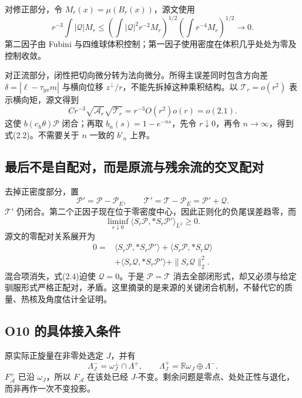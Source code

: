 \documentclass[UTF8,11pt,openany,fontset=none]{ctexbook}
\theoremstyle{definition}
\theoremstyle{remark}
\begin{document}
对修正部分，令 \(M_r(x)=\mu(B_r(x))\)，源文使用 \[
 r^{-3}\int |\mathscr Q|M_r
 \le
 \left(\int|\mathscr Q|^2r^{-2}M_r\right)^{1/2}
 \left(\int r^{-4}M_r\right)^{1/2}\longrightarrow0.
\] 第二因子由 Fubini 与四维球体积控制；第一因子使用密度在体积几乎处处为零及控制收敛。

对正流部分，闭性把切向微分转为法向微分。所得主误差同时包含方向差 \(\delta=|\ell-\tau_{yx}m|\) 与横向位移 \(z^\perp/r\)，不能先拆掉这种乘积结构。以 \(\mathcal T_r=o(r^2)\) 表示横向矩，源文得到 \[
 Cr^{-3}\sqrt{\mathcal A_r}\sqrt{\mathcal T_r}
 =r^{-3}O(r^2)o(r)=o(2.1).
\tag{2.3}
\] 这使 \(b(c_h\theta)\mathscr P\) 闭合；再取 \(b_n(s)=1-e^{-ns}\)，先令 \(r\downarrow0\)，再令 \(n\to\infty\)，得到式(2.2)。不需要关于 \(n\) 一致的 \(b'_n\) 上界。

\subsection{最后不是自配对，而是原流与残余流的交叉配对}\label{v2-ux6700ux540eux4e0dux662fux81eaux914dux5bf9ux800cux662fux539fux6d41ux4e0eux6b8bux4f59ux6d41ux7684ux4ea4ux53c9ux914dux5bf9}

去掉正密度部分，置 \[
 \mathscr P'=\mathscr P-\mathscr P_E,\qquad
 \mathscr T'=\mathscr T-\mathscr P_E=\mathscr P'+\mathscr Q.
\] \(\mathscr T'\) 仍闭合。第二个正因子现在位于零密度中心，因此正则化的负尾误差趋零，而 \[
 \liminf_{r\downarrow0}
 \langle S_r\mathscr P,*S_r\mathscr P'\rangle_{L^2}\ge0.
\] 源文的零配对关系展开为 \[
 \begin{aligned}
 0={}&\langle S_r\mathscr P,*S_r\mathscr P'\rangle
 +\langle S_r\mathscr P,*S_r\mathscr Q\rangle\\
 &+\langle S_r\mathscr Q,*S_r\mathscr P'\rangle
 +\|S_r\mathscr Q\|_2^2.
 \end{aligned}
\tag{2.4}
\] 混合项消失，式(2.4)迫使 \(\mathscr Q=0\)。于是 \(\mathscr P=\mathscr T\) 消去全部闭形式，却又必须与给定驯服形式严格正配对，矛盾。这里摘录的是来源的关键闭合机制，不替代它的质量、热核及角度估计全证明。

\subsection{O10 的具体接入条件}\label{v2-o10-ux7684ux5177ux4f53ux63a5ux5165ux6761ux4ef6}

原实际正旋量在非零处选定 \(J\)，并有 \[
 \Lambda_J^- =\omega_J^\perp\cap\Lambda^+,\qquad
 \Lambda_J^+=\mathbb R\omega_J\oplus\Lambda^-.
\] \(F_{\mathcal A}^+\) 已沿 \(\omega_J\)，所以 \(F_{\mathcal A}\) 在该处已经 \(J\)-不变。剩余问题是零点、处处正性与退化，而非再作一次不变投影。
\end{document}

